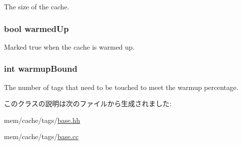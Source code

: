 \label{classBaseTags_ad3f1cf0299fe68eb9a68a7c67232c62d}
The size of the cache. \hypertarget{classBaseTags_a63243e2a441445feb3cf7a36fbaf4673}{
\subsubsection[{warmedUp}]{\setlength{\rightskip}{0pt plus 5cm}bool {\bf warmedUp}}}
\label{classBaseTags_a63243e2a441445feb3cf7a36fbaf4673}
Marked true when the cache is warmed up. \hypertarget{classBaseTags_a34cba5da4dbcf8dec784f2ebf3bcb431}{
\subsubsection[{warmupBound}]{\setlength{\rightskip}{0pt plus 5cm}int {\bf warmupBound}}}
\label{classBaseTags_a34cba5da4dbcf8dec784f2ebf3bcb431}
The number of tags that need to be touched to meet the warmup percentage. 

このクラスの説明は次のファイルから生成されました:\begin{DoxyCompactItemize}
\item 
mem/cache/tags/\hyperlink{mem_2cache_2tags_2base_8hh}{base.hh}\item 
mem/cache/tags/\hyperlink{mem_2cache_2tags_2base_8cc}{base.cc}\end{DoxyCompactItemize}
